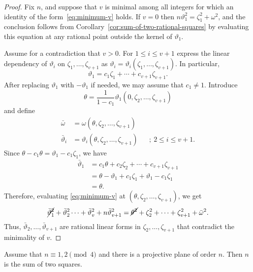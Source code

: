 \begin{proof}
    Fix\/ $n$, and suppose that\/ $v$ is minimal among all integers for which an identity of the form~\eqref{eq:minimum-v} holds. If $v=0$ then $n\vartheta_1^2 = \zeta_1^2 + \omega^2$, and the conclusion follows from Corollary~\ref{cor:sum-of-two-rational-squares} by evaluating this equation at any rational point outside the kernel of $\vartheta_1$.

    Assume for a contradiction that $v>0$. For $1\le i\le v+1$ express the linear dependency of $\vartheta_i$ on $\zeta_1,\dots,\zeta_{v+1}$ as $\vartheta_i=\vartheta_i(\zeta_1,\dots,\zeta_{v+1})$. In particular,
    $$
        \vartheta_1 = c_1\zeta_1+\cdots+c_{v+1}\zeta_{v+1}.
    $$
    After replacing $\vartheta_1$ with $-\vartheta_1$ if needed, we may assume that $c_1\ne1$. Introduce
    $$
        \theta = \frac1{1-c_1}\vartheta_1(0,\zeta_2,\dots,\zeta_{v+1})
    $$
    and define
    \begin{align*}
        \bar\omega &= \omega(\theta,\zeta_2,\dots,\zeta_{v+1})\\
        \bar\vartheta_i &=
            \vartheta_i(\theta,\zeta_2,\dots,\zeta_{v+1})
            &&;\ 2\le i\le v+1.
    \end{align*}
    Since $\theta-c_1\theta=\vartheta_1-c_1\zeta_1$, we have
    \begin{align*}
        \bar\vartheta_1
            &= c_1\theta+c_2\zeta_2+\cdots+c_{v+1}\zeta_{v+1}\\
            &= \theta - \vartheta_1 + c_1\zeta_1
                + \vartheta_1 - c_1\zeta_1\\
            &= \theta.
    \end{align*}
    Therefore, evaluating \eqref{eq:minimum-v} at $(\theta,\zeta_2,\dots,\zeta_{v+1})$, we get
    $$
        \cancel{\bar\vartheta_1^2}+\bar\vartheta_2^2\cdots+\bar\vartheta_v^2+n\bar\vartheta_{v+1}^2
            = \cancel{\theta^2}+\zeta_2^2+\cdots+\zeta_{v+1}^2
                +\bar\omega^2.
    $$
    Thus, $\bar\vartheta_2,\dots,\bar\vartheta_{v+1}$ are rational linear forms in $\zeta_2,\dots,\zeta_{v+1}$ that contradict the minimality of $v$.

\end{proof}


\begin{thm}\label{thm:bruck-ryser} {}
    Assume that\/ $n\equiv 1,2\pmod4$ and there is a projective plane of order\/ $n$. Then\/ $n$ is the sum of two squares.
\end{thm}

